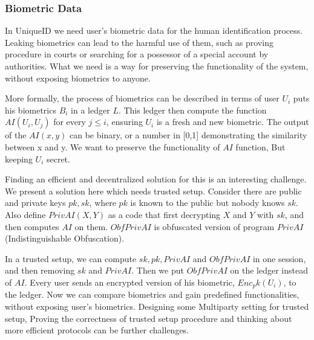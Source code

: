 \documentclass[conference]{IEEEtran}
\begin{document}
\subsubsection*{Biometric Data}
In UniqueID we need user's biometric data for the human identification process. Leaking biometrics can lead to the harmful use of them, such as proving procedure in courts or searching for a possessor of a special account by authorities. What we need is a way for preserving the functionality of the system, without exposing biometrics to anyone.


More formally, the process of biometrics can be described in terms of user $U_i$ puts his biometrics $B_i$ in a ledger $L$. This ledger then compute the function $AI(U_i,U_j)$ for every $j \leq i$, ensuring $U_i$ is a fresh and new biometric. The output of the $AI(x,y)$ can be binary, or a number in [0,1] demonstrating the similarity between x and y. We want to preserve the functionality of $AI$ function, But keeping $U_i$ secret. 

Finding an efficient and decentralized solution for this is an interesting challenge. We present a solution here which needs trusted setup. Consider there are public and private keys $pk,sk$, where $pk$ is known to the public but nobody knows $sk$. Also define $PrivAI(X, Y)$ as a code that first decrypting $X$ and $Y$ with $sk$, and then computes $AI$ on them. $ObfPrivAI$ is obfuscated version of program $PrivAI$ (Indistinguishable Obfuscation). 

In a trusted setup, we can compute $sk,pk,PrivAI$ and $ObfPrivAI$ in one session, and then removing $sk$ and $PrivAI$. Then we put $ObfPrivAI$ on the ledger instead of $AI$. Every user sends an encrypted version of his biometric, $Enc_pk(U_i)$, to the ledger. Now we can compare biometrics and gain predefined functionalities, without exposing user's biometrics. Designing some Multiparty setting for trusted setup, Proving the correctness of trusted setup procedure and thinking about more efficient protocols can be further challenges. 
\end{document}
